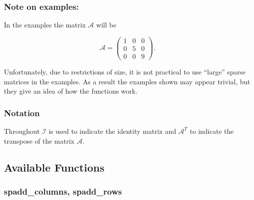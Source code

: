 \subsubsection*{Note on examples:}

In the examples the matrix $\mathcal{A}$ will be

\[
\mathcal{A} = \begin{pmatrix} 1 & 0 & 0 \\ 0 & 5 & 0 \\ 0 & 0 & 9 \end{pmatrix}.
\]

Unfortunately, due to restrictions of size, it is not practical to use
``large'' sparse matrices in the examples. As a result the examples
shown may appear trivial, but they give an idea of how the functions
work.

\subsubsection*{Notation}

Throughout $\mathcal{I}$ is used to indicate the identity matrix and
$\mathcal{A}^T$ to indicate the transpose of the matrix $\mathcal{A}$.

\subsection{Available Functions}
\label{sec:sparse-available-functions}

\subsubsection{spadd\_columns, spadd\_rows}
\label{sparse:spadd_columns}
\hypertarget{operator:SPADD_COLUMNS}{}

